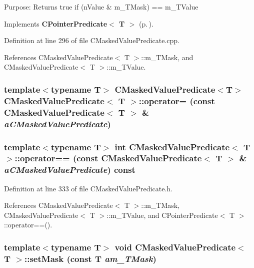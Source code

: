 Purpose: Returns true if (n\-Value \& m\_\-TMask) == m\_\-TValue 

Implements {\bf CPointer\-Predicate$<$ T $>$} {\rm (p.\,\pageref{classCPointerPredicate_a5})}.

Definition at line 296 of file CMasked\-Value\-Predicate.cpp.

References CMasked\-Value\-Predicate$<$ T $>$::m\_\-TMask, and CMasked\-Value\-Predicate$<$ T $>$::m\_\-TValue.
\subsubsection{\setlength{\rightskip}{0pt plus 5cm}template$<$typename T$>$ CMasked\-Value\-Predicate$<$T$>$ CMasked\-Value\-Predicate$<$ T $>$::operator= (const CMasked\-Value\-Predicate$<$ T $>$ \& {\em a\-CMasked\-Value\-Predicate})\hspace{0.3cm}{\tt  [private]}}\label{classCMaskedValuePredicate_c1}


\subsubsection{\setlength{\rightskip}{0pt plus 5cm}template$<$typename T$>$ int CMasked\-Value\-Predicate$<$ T $>$::operator== (const CMasked\-Value\-Predicate$<$ T $>$ \& {\em a\-CMasked\-Value\-Predicate}) const\hspace{0.3cm}{\tt  [inline]}}\label{classCMaskedValuePredicate_a4}




Definition at line 333 of file CMasked\-Value\-Predicate.h.

References CMasked\-Value\-Predicate$<$ T $>$::m\_\-TMask, CMasked\-Value\-Predicate$<$ T $>$::m\_\-TValue, and CPointer\-Predicate$<$ T $>$::operator==().
\subsubsection{\setlength{\rightskip}{0pt plus 5cm}template$<$typename T$>$ void CMasked\-Value\-Predicate$<$ T $>$::set\-Mask (const T {\em am\_\-TMask})\hspace{0.3cm}{\tt  [inline, protected]}}\label{classCMaskedValuePredicate_b0}




